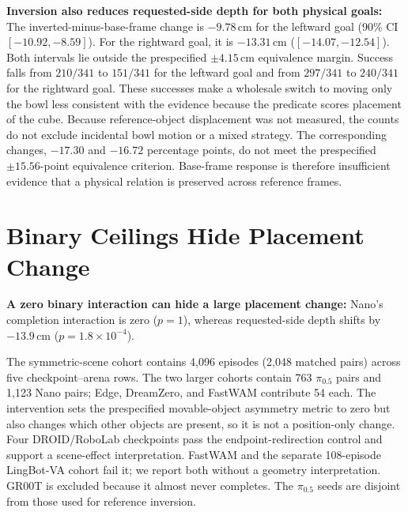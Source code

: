 \documentclass[letterpaper,10pt,conference]{ieeeconf}%
\newcommand{\tightparagraph}[1]{\vspace{0.25em}\noindent\textbf{#1}}
\begin{document}
\tightparagraph{Inversion also reduces requested-side depth for both physical goals:}
The inverted-minus-base-frame change is $-9.78$\,cm for the leftward goal (90\% CI $[-10.92,-8.59]$).
For the rightward goal, it is $-13.31$\,cm ($[-14.07,-12.54]$).
Both intervals lie outside the prespecified $\pm4.15$\,cm equivalence margin.
Success falls from $210/341$ to $151/341$ for the leftward goal and from $297/341$ to $240/341$ for the rightward goal.
These successes make a wholesale switch to moving only the bowl less consistent with the evidence because the predicate scores placement of the cube.
Because reference-object displacement was not measured, the counts do not exclude incidental bowl motion or a mixed strategy.
The corresponding changes, $-17.30$ and $-16.72$ percentage points, do not meet the prespecified $\pm15.56$-point equivalence criterion.
Base-frame response is therefore insufficient evidence that a physical relation is preserved across reference frames.

\section{Binary Ceilings Hide Placement Change}
\label{sec:symmetry}

\tightparagraph{A zero binary interaction can hide a large placement change:}
Nano's completion interaction is zero ($p=1$), whereas requested-side depth shifts by $-13.9$\,cm ($p=1.8\times10^{-4}$).

The symmetric-scene cohort contains 4,096 episodes (2,048 matched pairs) across five checkpoint--arena rows.
The two larger cohorts contain 763 $\pi_{0.5}$ pairs and 1,123 Nano pairs; Edge, DreamZero, and FastWAM contribute 54 each.
The intervention sets the prespecified movable-object asymmetry metric to zero but also changes which other objects are present, so it is not a position-only change.
Four DROID/RoboLab checkpoints pass the endpoint-redirection control and support a scene-effect interpretation.
FastWAM and the separate 108-episode LingBot-VA cohort fail it; we report both without a geometry interpretation.
GR00T is excluded because it almost never completes.
The $\pi_{0.5}$ seeds are disjoint from those used for reference inversion.
\end{document}
